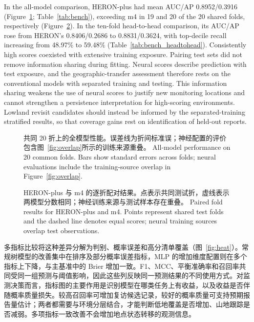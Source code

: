 \else
In the all-model comparison, HERON-plus had mean AUC/AP 0.8952/0.3916 (Figure~\ref{fig:bench}; Table~\ref{tab:bench}), exceeding m4 in 19 and 20 of the 20 shared folds, respectively (Figure~\ref{fig:paired}). In the ten-fold head-to-head comparison, its AUC/AP rose from HERON's 0.8406/0.2686 to 0.8831/0.3624, with top-decile recall increasing from 48.97\% to 59.48\% (Table~\ref{tab:bench_headtohead}). Consistently high scores coexisted with extensive training exposure. Pairing test sets did not remove information sharing during fitting. Neural scores describe prediction with test exposure, and the geographic-transfer assessment therefore rests on the conventional models with separated training and testing. This information sharing weakens the use of neural scores to justify new monitoring locations and cannot strengthen a persistence interpretation for high-scoring environments. Lowland revisit candidates should instead be informed by the separated-training stratified results, so that coverage gains rest on identification of held-out reports.
\fi
\begin{figure}[htbp]\centering{}
\caption{\ifzh
共同 20 折上的全模型性能。误差线为折间标准误；神经配置的评价包含图~\ref{fig:overlap}所示的训练来源重叠。
\else
All-model performance on 20 common folds. Bars show standard errors across folds; neural evaluations include the training-source overlap in Figure~\ref{fig:overlap}.
\fi}\label{fig:bench}
\end{figure}
\begin{figure}[htbp]\centering{}
\caption{\ifzh
HERON-plus 与 m4 的逐折配对结果。点表示共同测试折，虚线表示两模型分数相同；神经训练来源与测试样本存在重叠。
\else
Paired fold results for HERON-plus and m4. Points represent shared test folds and the dashed line denotes equal scores; neural training sources overlap test observations.
\fi}\label{fig:paired}
\end{figure}
\ifzh
多指标比较将这种差异分解为判别、概率误差和高分清单覆盖（图~\ref{fig:heat}）。常规树模型的改善集中在排序及部分概率误差指标，MLP 的增加维度配置则在多个指标上下降，与主基准中的 Brier 增加一致。F1、MCC、平衡准确率和召回率共同受同一组预测与阈值影响，因此这些列反映同一预测结果的不同使用方式。对监测决策而言，指标图的主要作用是识别模型在哪类任务上有收益，以及收益是否伴随概率质量损失。较高召回率可增加复访候选记录，较好的概率质量可支持预期报告量估计；两者都需要与环境分层结合，才能判断低地覆盖是否增加、山地跟踪是否减弱。多项指标一致改善不会增加地点状态转移的观测信息。
